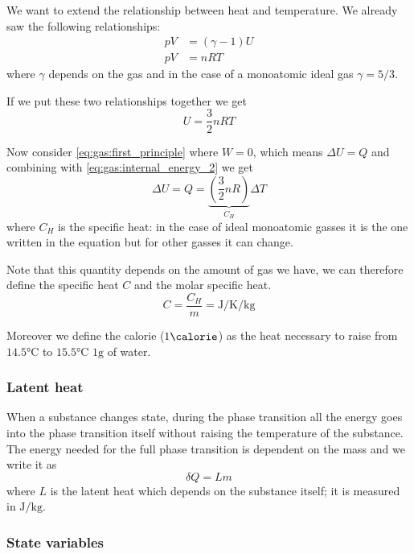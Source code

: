 \documentclass[12pt]{extarticle}
\begin{document}
We want to extend the relationship between heat and temperature.
We already saw the following relationships:
\begin{align}
    pV & = (\gamma - 1)U \\
    pV & = nRT
\end{align}
where $\gamma$ depends on the gas and in the case of a monoatomic ideal gas $\gamma = 5/3$.

If we put these two relationships together we get
\begin{equation}
    \label{eq:gas:internal_energy_2}
    U = \frac{3}{2}nRT
\end{equation}

Now consider \autoref{eq:gas:first_principle} where $W = 0$, which means $\Delta U = Q$ and combining with \autoref{eq:gas:internal_energy_2} we get
\begin{equation}
    \Delta U = Q = \underbrace{\left(\frac{3}{2} n R \right)}_{C_H} \Delta T
\end{equation}
where $C_H$ is the specific heat: in the case of ideal monoatomic gasses it is the one written in the equation but for other gasses it can change.

Note that this quantity depends on the amount of gas we have, we can therefore define the specific heat $C$ and the molar specific heat.
\begin{equation}
    C = \frac{C_H}{m} = \si{\joule \per \kelvin \per \kilogram}
\end{equation}

Moreover we define the calorie ($1 \si{\calorie}$) as the heat necessary to raise from $14.5 \si{\celsius}$ to $15.5 \si{\celsius}$ $1 \si{\gram}$ of water.

\subsubsection{Latent heat}
When a substance changes state, during the phase transition all the energy goes into the phase transition itself without raising the temperature of the substance.
The energy needed for the full phase transition is dependent on the mass and we write it as
\begin{equation}
    \delta Q = L m
\end{equation}
where $L$ is the latent heat which depends on the substance itself; it is measured in $\si{\joule \per \kilogram}$.

\subsubsection{State variables}
\end{document}
